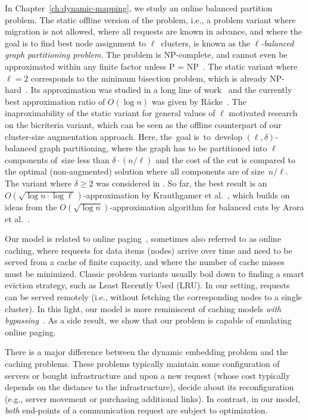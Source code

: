 \medskip

In Chapter~\ref{ch:dynamic-mapping}, we study an online balanced partition problem.
The static offline version of the problem, i.e., a problem variant where
migration is not allowed, where all requests are known in advance, and where
the goal is to find best node assignment to $\ell$~clusters, is known as the
\emph{$\ell$-balanced graph partitioning problem}. The problem is 
NP-complete, and cannot even be approximated within any finite factor unless P
= NP~\cite{AndRae06}.  The static
variant where $\ell = 2$ corresponds to the minimum bisection problem, which
is already NP-hard~\cite{GaJoSt76}.
Its approximation was studied in a long
line of work~\cite{SarVaz95,ArKaKa99,FeKrNi00,FeiKra02,KraFei06,Raec08} and
the currently best approximation ratio of $O(\log n)$ was given by
R{\"{a}}cke~\cite{Raec08}.
The inaproximability of the static variant for general values of $\ell$
motivated research on the bicriteria variant, which can be seen as the offline
counterpart of our cluster-size augmentation approach. Here, the~goal
is~to~develop $(\ell,\delta)$-balanced graph partitioning, where the graph has
to be partitioned into $\ell$ components of~size less than $\delta \cdot (n /
\ell)$ and the cost of the cut is compared to the optimal (non-augmented)
solution where all components are of size~$n / \ell$. The variant where
$\delta \geq 2$ was considered in
\cite{LeMaTr90,SimTen97,EvNaRS00,EvNaRS99,KrNaSc09}. So far, the best result is
an $O(\!\sqrt{\log n \cdot \log \ell})$-approximation by Krauthgamer et
al.~\cite{KrNaSc09}, which builds on ideas from the $O(\!\sqrt{\log
n})$-approximation algorithm for balanced cuts by Arora et al.~\cite{ArRaVa09}.

Our model is related to online
paging~\cite{SleTar85,FKLMSY91,McGSle91,AcChNo00}, sometimes also referred to
as online caching, where requests for data items (nodes) arrive over time and
need to be served from a cache of finite capacity, and where the number of
cache misses must be minimized. Classic problem variants usually boil down to
finding a smart eviction strategy, such as Least Recently Used (LRU). In our
setting, requests can be served remotely (i.e., without fetching the
corresponding nodes to a single cluster). In this light, our model is more
reminiscent of caching models \emph{with
bypassing}~\cite{EpImLN11,EpImLN15,Irani02}. As a side result, we show that our problem is
capable of emulating online paging.

There is a major difference between the dynamic embedding problem and the caching problems.
These problems typically maintain some configuration of servers or
bought infrastructure and upon a new request (whose cost typically depends on
the distance to the infrastructure), decide about its reconfiguration (e.g.,
server movement or purchasing additional links). In contrast, in our model,
\emph{both} end-points of a communication request are subject to optimization.



